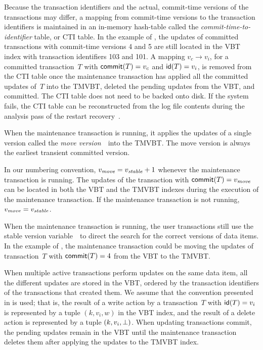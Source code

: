 Because the transaction identifiers and the actual, commit-time
versions of the transactions may differ, a mapping from commit-time
versions to the transaction identifiers is maintained in an in-memory
hash-table called the \emph{commit-time-to-identifier} table, or
CTI\label{def:cti} table. 
In the example of , the updates of committed
transactions with commit-time versions \num{4} and \num{5} are still
located in the VBT index with transaction identifiers \num{103} and
\num{101}. 
A mapping $v_c \to v_i$, for a committed transaction~$T$ with
$\text{\textsf{commit}}(T) = v_c$ and $\text{\textsf{id}}(T) = v_i$, is removed from the
CTI table once the maintenance transaction has applied all the committed
updates of~$T$ into the TMVBT, deleted the pending updates from
the VBT, and committed.
The CTI table does not need to be backed onto disk. 
If the system fails, the CTI table can be reconstructed from the
log file contents during the analysis pass of the  restart
recovery~\cite{mohan:1992:aries}.
 
\thmskip
\begin{definition}
\label{def:movever}
When the maintenance transaction is running, it applies the updates of
a single version called the \emph{move version}~\movever\ into the TMVBT\@.
The move version is always the earliest transient committed version.
\end{definition}
\thmskip

\thmskip
\begin{invariant}
In our numbering convention, $\smash{v_{\text{\textit{move}}}} = \smash{v_{\text{\textit{stable}}}} + 1$ whenever
the maintenance transaction is running.
The updates of the transaction with $\text{\textsf{commit}}(T) = \smash{v_{\text{\textit{move}}}}$ can be located
in both the VBT and the TMVBT indexes during the execution of the maintenance
transaction.
If the maintenance transaction is not running, $\smash{v_{\text{\textit{move}}}} = \smash{v_{\text{\textit{stable}}}}$.
\end{invariant}
\thmskip

When the maintenance transaction is running, the user transactions
still use the stable version variable~\stablever\ to direct the
search for the correct versions of data items.
In the example of , the maintenance
transaction could be moving the updates of transaction~$T$ with
$\text{\textsf{commit}}(T) = 4$ from the VBT to the TMVBT\@. 

When multiple active transactions perform updates on the same data item, 
all the different updates are stored in the VBT, ordered by the transaction
identifiers of the transactions that created them.
We assume that the convention presented in  is
used; that is, the result of a write action by a transaction~$T$ with
$\text{\textsf{id}}(T) = v_i$ is represented by a tuple $(k, v_i, w)$ in the VBT index, and
the result of a delete action is represented by a tuple $(k, v_i,
\bot)$.
When updating transactions commit, the pending updates remain in the
VBT until the maintenance transaction deletes them after applying the updates
to the TMVBT index.

